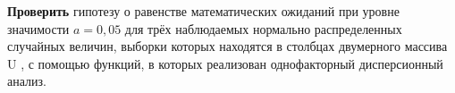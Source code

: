 \textbf{Проверить} гипотезу о равенстве математических ожиданий при уровне
значимости $a=0,05$ для трёх наблюдаемых нормально распределенных
случайных величин, выборки которых находятся в столбцах двумерного
массива U , с помощью функций, в которых реализован однофакторный
дисперсионный анализ.



